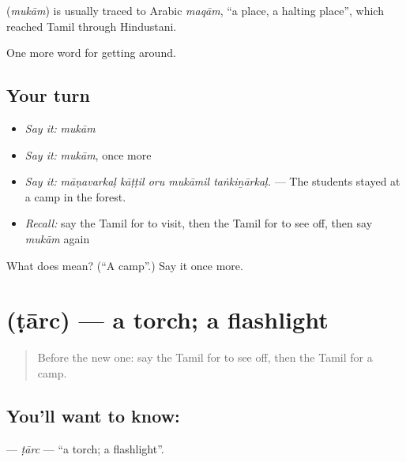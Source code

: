\begin{cousinweb}
\textbf{} (\emph{mukām}) is usually traced to Arabic \emph{maqām}, \textquotedblleft{}a place, a halting place\textquotedblright{}, which reached Tamil through Hindustani.
\end{cousinweb}

\begin{grammarlens}[title={What you've built}]
One more word for getting around.
\end{grammarlens}

\subsection*{Your turn}
\begin{itemize}
\raggedright
  \item \emph{Say it:} \emph{mukām}
  \item \emph{Say it:} \emph{mukām}, once more
  \item \emph{Say it:} \emph{māṇavarkaḷ kāṭṭil oru mukāmil taṅkiṉārkaḷ.} — The students stayed at a camp in the forest.
  \item \emph{Recall:} say the Tamil for to visit, then the Tamil for to see off, then say \emph{mukām} again
\end{itemize}

\begin{tcolorbox}[breakable,colback=teal!4,colframe=teal!35!black,title={Before you move on}]
What does  mean? (\textquotedblleft{}A camp\textquotedblright{}.) Say it once more.
\end{tcolorbox}
\section[\texorpdfstring{\ta{டார்ச்} (ṭārc)}{டார்ச் (ṭārc)}]{ (ṭārc) — a torch; a flashlight}

\label{lesson:TA-C422-tarc}



\begin{quote}
Before the new one: say the Tamil for to see off, then the Tamil for a camp.
\end{quote}

\subsection*{You'll want to know: }
\textbf{} — \emph{ṭārc} — \textquotedblleft{}a torch; a flashlight\textquotedblright{}.

